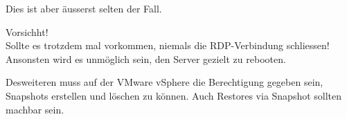 \begin{flushleft}
    Dies ist aber äusserst selten der Fall.

    \begin{mdframed}
    Vorsichht!\\Sollte es trotzdem mal vorkommen, niemals die \Gls{RDP}-Verbindung schliessen!\\Ansonsten wird es unmöglich sein, den Server gezielt zu rebooten.
    \end{mdframed}
\end{flushleft}
\begin{flushleft}
    Desweiteren muss auf der \Gls{VMware vSphere} die Berechtigung gegeben sein, Snapshots erstellen und löschen zu können.
    Auch Restores via Snapshot sollten machbar sein.
\end{flushleft}